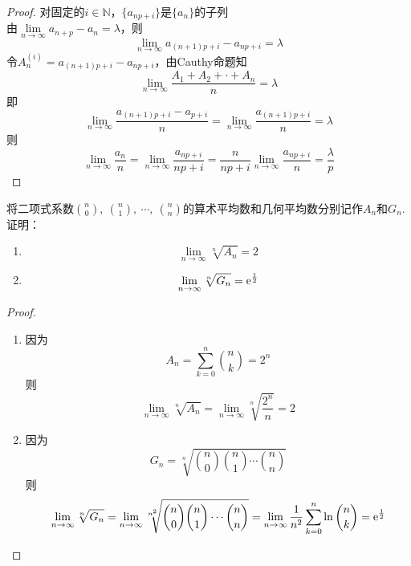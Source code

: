 \begin{proof}
    
    对固定的$i \in \mathbb{N}$，$\{a_{np + i}\}$是$\{a_{n}\}$的子列\\
    由$\lim\limits_{n\to\infty}{a_{n+p} - a_n} = \lambda$，则
    $$\lim\limits_{n\to\infty}{a_{(n+1)p + i} - a_{np+i}} = \lambda$$
    令$A^{(i)}_{n} = a_{(n+1)p+i} - a_{np + i}$，由\textup{Cauthy}命题知
    $$\lim_{n\to\infty}{\dfrac{A_1 + A_2 + \cdot + A_n}{n}} = \lambda$$
    即
    $$\lim_{n\to\infty}{\dfrac{a_{(n+1)p+i} - a_{p+i}}{n}} = \lim_{n\to\infty}{\dfrac{a_{(n+1)p+i}}{n}} = \lambda$$
    则
    $$\lim_{n\to\infty}{\dfrac{a_n}{n}} = \lim_{n\to\infty}{\dfrac{a_{np+i}}{np+i}} = \dfrac{n}{np+i} \lim_{n\to\infty}{\dfrac{a_{np+i}}{n}} = \dfrac{\lambda}{p}$$

\end{proof}

\begin{proposition}

    将二项式系数$\binom{n}{0},\ \binom{n}{1},\ \cdots, \ \binom{n}{n}$的算术平均数和几何平均数分别记作$A_n$和$G_n$. 证明：

    \begin{enumerate}

        \item 
                $$\lim_{n\to\infty}{\sqrt[n]{A_n}} = 2$$
                
        \item   
                $$\lim_{n\to\infty}{\sqrt[n]{G_n}} = \mathrm{e}^{\frac{1}{2}}$$

    \end{enumerate}

\end{proposition}

\begin{proof}

    \begin{enumerate}
        
        \item 
            因为$$A_n = \sum_{k=0}^{n}{\binom{n}{k}} = 2^n$$则
            $$\lim_{n\to\infty}{\sqrt[n]{A_n}} = \lim_{n\to\infty}{\sqrt[n]{\dfrac{2^n}{n}}} = 2$$

        \item 
            因为$$G_n = \sqrt[n]{\binom{n}{0}\binom{n}{1}\cdots\binom{n}{n}}$$则
            $$\lim_{n\to\infty}{\sqrt[n]{G_n}}  = \lim_{n\to\infty}{\sqrt[n^2]{\binom{n}{0}\binom{n}{1}\cdots\binom{n}{n}}} = \lim_{n\to\infty}{\dfrac{1}{n^2} \sum\limits_{k=0}^{n}{\ln{\binom{n}{k}}}} = \mathrm{e}^{\frac{1}{2}}  $$
    
        \end{enumerate}
    
\end{proof}

